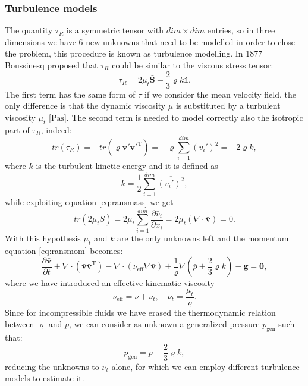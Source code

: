 \subsubsection{Turbulence models}
The quantity $\tau_R$ is a symmetric tensor with $dim \times dim$ entries, so 
in three 
dimensions we have 6 new unknowns that need to be modelled in order to close 
the problem, this procedure is known as turbulence modelling.
In 1877 Boussinesq proposed that $\tau_R$ could be similar to the viscous 
stress tensor:
\begin{equation} \label{eq:bouss}
\tau_R = 2\mu_t \bar{\mathbf{S}} - 
\frac{2}{3}\varrho k \mathbb{1}.
\end{equation}
The first term has the same form of $\tau$ if we consider the mean velocity 
field, 
the only difference is that the dynamic viscosity $\mu$ is substituted by a 
turbulent viscosity $\mu_t$ [$\si{\pascal \second}$]. The second term is needed 
to model correctly also the isotropic part of $\tau_R$, indeed:
\begin{equation} \label{eq:tracciatau}
tr(\tau_R) = -tr(\varrho \overline{\mathbf{v}' {\mathbf{v}'}^\mathrm{T}}) = 
-\varrho \sum_{i=1}^{dim} \overline{(v_i')^2} = -2\varrho k,
\end{equation}
where $k$ is the turbulent kinetic energy and it is defined as
\begin{equation}
k = \frac{1}{2} \sum_{i=1}^{dim} \overline{(v_i')^2},
\end{equation}
while exploiting equation \eqref{eq:ransmass} we get
\begin{equation}
	tr(2\mu_t \bar{S}) = 2 \mu_t \sum_{i=1}^{dim} \frac{\partial 
	\bar{v}_i}{\partial x_i} = 2\mu_t (\nabla \cdot \bar{\mathbf{v}}) = 0.
\end{equation}
With this hypothesis $\mu_t$ and $k$ are the only unknowns left and the 
momentum equation \eqref{eq:ransmom} becomes:
\begin{equation} \label{eq:ransmom2}
\frac{\partial \bar{\mathbf{v}}}{\partial t} + \nabla 
\cdot ( \bar{\mathbf{v}} \bar{\mathbf{v}}^\mathrm{T}) - \nabla \cdot 
(\nu_\text{eff} \nabla \bar{\mathbf{v}}) + \frac{1}{\varrho}\nabla (\bar{p} + 
\frac{2}{3}\varrho k) - \mathbf{g} = \mathbf{0},
\end{equation}
where we have introduced an effective kinematic viscosity
\begin{equation}
	\nu_\text{eff} = \nu + \nu_t, \quad \nu_t = \frac{\mu_t}{\varrho}.
\end{equation}
Since for incompressible fluids we have erased the thermodynamic relation 
between $\varrho$ and $p$, we can consider as unknown a generalized pressure 
$p_\text{gen}$ such that:
\begin{equation}
p_\text{gen} = \bar{p} + \frac{2}{3}\varrho k,
\end{equation}
reducing the unknowns to $\nu_t$ alone, for which we can employ different 
turbulence models to estimate it.

